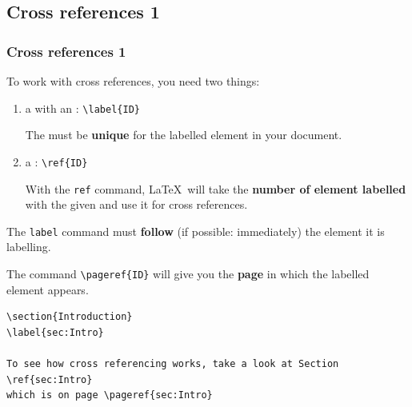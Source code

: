\subsection{Cross references 1}

\begin{frame}[fragile]
\frametitle{Cross references 1}

To work with cross references, you need two things:

\begin{enumerate}
	\item a  with an : \lstinline|\label{ID}| 
	
	The  must be \textbf{unique} for the labelled element in your document.
	
	\item a : \lstinline|\ref{ID}| 
	
	With the \lstinline|ref| command, \LaTeX\ will take the \textbf{number of element labelled} with the given  and use it for cross references.
\end{enumerate}

\pause 


The \lstinline|label| command must \textbf{follow} (if possible: immediately) the element it is labelling.


\bigskip 

The command \lstinline|\pageref{ID}| will give you the \textbf{page} in which the labelled element appears.

\begin{lstlisting}
\section{Introduction}
\label{sec:Intro}

To see how cross referencing works, take a look at Section \ref{sec:Intro} 
which is on page \pageref{sec:Intro}
\end{lstlisting}

\end{frame}


